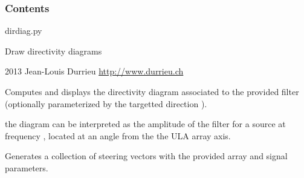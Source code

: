 \documentclass[letterpaper,10pt,english]{sphinxmanual}
\begin{document}
\subsubsection{Contents}
\label{reference/spatial:module-pyfasst.spatial.dirdiag}\label{reference/spatial:contents}
dirdiag.py

Draw directivity diagrams

2013 Jean-Louis Durrieu
\href{http://www.durrieu.ch}{http://www.durrieu.ch}

\begin{fulllineitems}
\label{reference/spatial:pyfasst.spatial.dirdiag.directivity_filter_diagram_ULA}
Computes and displays the directivity diagram associated to
the provided filter  (optionally parameterized by the
targetted direction ).

the diagram can be interpreted as the amplitude of the filter for
a source at frequency , located at an angle  from
the the ULA array axis.

\end{fulllineitems}


\begin{fulllineitems}
\label{reference/spatial:pyfasst.spatial.dirdiag.generate_steer_vec_thetas}
Generates a collection of steering vectors with the provided array and
signal parameters.

\end{fulllineitems}

\end{document}

